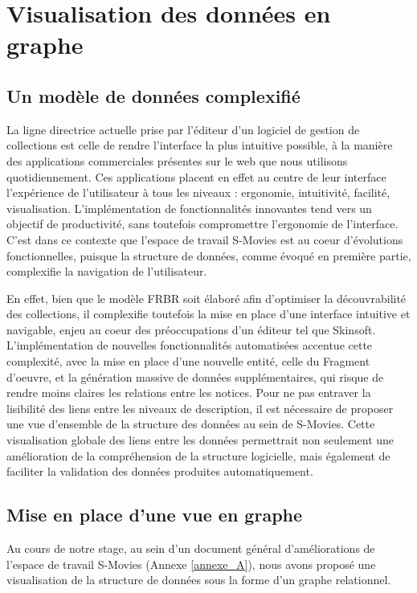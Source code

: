 \section{\label{III_2_A}Visualisation des données en graphe}

\subsection{Un modèle de données complexifié}
La ligne directrice actuelle prise par l'éditeur d'un logiciel de gestion de collections est celle  de rendre l'interface la plus intuitive possible, à la manière des applications commerciales présentes sur le web que nous utilisons quotidiennement. Ces applications placent en effet au centre de leur interface l'expérience de l'utilisateur à tous les niveaux : ergonomie, intuitivité, facilité, visualisation. L'implémentation de fonctionnalités innovantes tend vers un objectif de productivité, sans toutefois compromettre l'ergonomie de l'interface. C'est dans ce contexte que l'espace de travail S-Movies est au coeur d'évolutions fonctionnelles, puisque la structure de données, comme évoqué en première partie, complexifie la navigation de l'utilisateur. 

En effet, bien que le modèle \gls{FRBR} soit élaboré afin d'optimiser la découvrabilité des collections, il complexifie toutefois la mise en place d'une interface intuitive et navigable, enjeu au coeur des préoccupations d'un éditeur tel que Skinsoft. L'implémentation de nouvelles fonctionnalités automatisées accentue cette complexité, avec la mise en place d'une nouvelle entité, celle du Fragment d'oeuvre, et la génération massive de données supplémentaires, qui risque de rendre moins claires les relations entre les notices. Pour ne pas entraver la lisibilité des liens entre les niveaux de description, il est nécessaire de proposer une vue d'ensemble de la structure des données au sein de S-Movies. Cette visualisation globale des liens entre les données permettrait non seulement une amélioration de la compréhension de la structure logicielle, mais également de faciliter la validation des données produites automatiquement.

\subsection{Mise en place d'une vue en graphe}
Au cours de notre stage, au sein d'un document général d'améliorations de l'espace de travail S-Movies (Annexe \ref{annexe_A}), nous avons proposé une visualisation de la structure de données sous la forme d'un graphe relationnel. 

